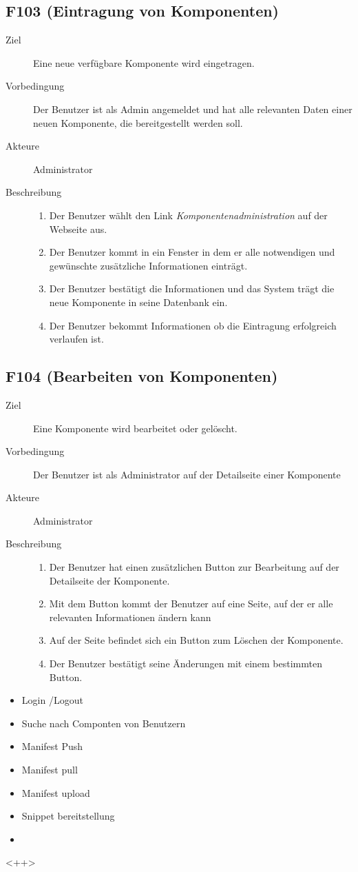\subsection{F103 (Eintragung von Komponenten)}
\label{F:Eintragen}
\begin{description}
  \item[Ziel]Eine neue verfügbare Komponente wird eingetragen.
  \item[Vorbedingung]Der Benutzer ist als Admin angemeldet und hat alle
	relevanten Daten einer neuen Komponente, die bereitgestellt werden soll.
  \item[Akteure]Administrator
   \item[Beschreibung]\hfill
    \begin{enumerate}
      \item Der Benutzer wählt den Link \emph{Komponentenadministration} auf der Webseite aus.
	  \item Der Benutzer kommt in ein Fenster in dem er alle notwendigen und
		gewünschte zusätzliche Informationen einträgt.
	  \item Der Benutzer bestätigt die Informationen und das System trägt die
		neue Komponente in seine Datenbank ein.
	  \item Der Benutzer bekommt Informationen ob die Eintragung erfolgreich
		verlaufen ist.
    \end{enumerate}
\end{description}


\subsection{F104 (Bearbeiten von Komponenten)}
\label{F:Bearbeiten}
\begin{description}
  \item[Ziel]Eine Komponente wird bearbeitet oder gelöscht.
  \item[Vorbedingung]Der Benutzer ist als Administrator auf der Detailseite
	einer Komponente
  \item[Akteure]Administrator
   \item[Beschreibung]\hfill
    \begin{enumerate}
      \item Der Benutzer hat einen zusätzlichen Button zur Bearbeitung auf der
		Detailseite der Komponente.
	  \item Mit dem Button kommt der Benutzer auf eine Seite, auf der er alle
		relevanten Informationen ändern kann
	  \item Auf der Seite befindet sich ein Button zum Löschen der Komponente.
	  \item Der Benutzer bestätigt seine Änderungen mit einem bestimmten
		Button.
    \end{enumerate}
\end{description}

\begin{itemize}
	\item Login /Logout
	\item Suche nach Componten von Benutzern
	\item Manifest Push
	\item Manifest pull
	\item Manifest upload
	\item Snippet bereitstellung
	\item 
\end{itemize}<++>
